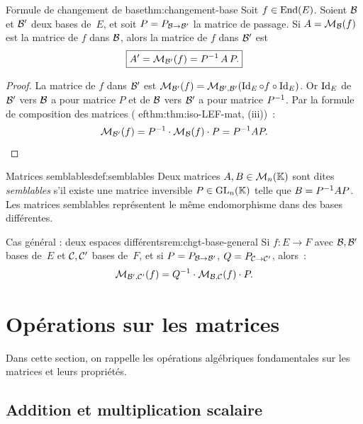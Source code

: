 \begin{theorem}{Formule de changement de base}{thm:changement-base}
  Soit $f\in\operatorname{End}(E)$. Soient ${\mathcal{B}}$ et ${\mathcal{B}}'$ deux bases de~$E$, et soit
  $P=P_{{\mathcal{B}}\to{\mathcal{B}}'}$ la matrice de passage. Si $A=\mathcal{M}_{\mathcal{B}}(f)$ est la
  matrice de $f$ dans ${\mathcal{B}}$, alors la matrice de $f$ dans ${\mathcal{B}}'$ est
  \[
    \boxed{A'=\mathcal{M}_{{\mathcal{B}}'}(f)={P}^{-1}\,A\,P.}
  \]
\end{theorem}

\begin{proof}
  La matrice de $f$ dans ${\mathcal{B}}'$ est $\mathcal{M}_{{\mathcal{B}}'}(f)
  =\mathcal{M}_{{\mathcal{B}}',{\mathcal{B}}'}(\operatorname{Id}_E\circ f\circ\operatorname{Id}_E)$. Or $\operatorname{Id}_E$ de ${\mathcal{B}}'$
  vers ${\mathcal{B}}$ a pour matrice $P$ et de ${\mathcal{B}}$ vers ${\mathcal{B}}'$ a pour matrice
  ${P}^{-1}$. Par la formule de composition des matrices
  (
ef{thm:thm:iso-LEF-mat}, (iii))~:
  \[
    \mathcal{M}_{{\mathcal{B}}'}(f)={P}^{-1}\cdot\mathcal{M}_{\mathcal{B}}(f)\cdot P={P}^{-1}AP. \qedhere
  \]
\end{proof}

\begin{definition}{Matrices semblables}{def:semblables}
  Deux matrices $A,B\in\mathcal{M}_n({\mathbb{K}})$ sont dites
  \emph{semblables} s'il existe une matrice
  inversible $P\in\operatorname{GL}_n({\mathbb{K}})$ telle que $B={P}^{-1}AP$. Les matrices
  semblables représentent le même endomorphisme dans des bases
  différentes.
\end{definition}

\begin{remark}{Cas général : deux espaces différents}{rem:chgt-base-general}
  Si $f\colon E\to F$ avec ${\mathcal{B}},{\mathcal{B}}'$ bases de~$E$ et ${\mathcal{C}},{\mathcal{C}}'$ bases
  de~$F$, et si $P=P_{{\mathcal{B}}\to{\mathcal{B}}'}$, $Q=P_{{\mathcal{C}}\to{\mathcal{C}}'}$, alors~:
  \[
    \mathcal{M}_{{\mathcal{B}}',{\mathcal{C}}'}(f)={Q}^{-1}\cdot\mathcal{M}_{{\mathcal{B}},{\mathcal{C}}}(f)\cdot P.
  \]
\end{remark}

\section{Opérations sur les matrices}\label{sec:operations-matrices}

Dans cette section, on rappelle les opérations algébriques fondamentales
sur les matrices et leurs propriétés.

\subsection{Addition et multiplication scalaire}\label{subsec:add-scal-mat}

